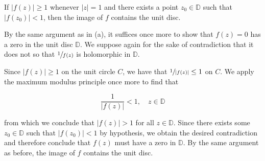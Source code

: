 If $|f(z)| \ge 1$ whenever $|z| = 1$ and there exists a point $z_0 \in \mathbb{D}$ such that $|f(z_0)| < 1$, 
then the image of $f$ contains the unit disc.

\begin{solution}
    By the same argument as in (a), it suffices once more to show that $f(z) = 0$ has a zero in the unit disc 
    $\mathbb{D}$. We suppose again for the sake of contradiction that it does not so that $\sfrac{1}{f(z)}$ is 
    holomorphic in $\mathbb{D}$.

    Since $|f(z)| \ge 1$ on the unit circle $C$, we have that $\sfrac{1}{|f(z)|} \le 1$ on $C$. We apply the maximum 
    modulus principle once more to find that

    $$
    \frac{1}{|f(z)|} < 1, \quad z \in \mathbb{D}
    $$

    from which we conclude that $|f(z)| > 1$ for all $z \in \mathbb{D}$. Since there exists some $z_0 \in \mathbb{D}$ 
    such that $|f(z_0)| < 1$ by hypothesis, we obtain the desired contradiction and therefore conclude that $f(z)$ must 
    have a zero in $\mathbb{D}$. By the same argument as before, the image of $f$ contains the unit disc.
    \ \\
\end{solution}